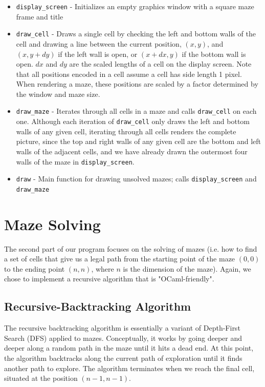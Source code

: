 \documentclass[11pt, margin=1in]{article}
\begin{document}
\begin{itemize}
\item \texttt{display\_screen} - Initializes an empty graphics window with a square maze frame and title
\item \texttt{draw\_cell} - Draws a single cell by checking the left and bottom walls of the cell and drawing a line between the current position, $(x, y)$, and $(x, y + dy)$ if the left wall is open, or $(x + dx, y)$ if the bottom wall is open. $dx$ and $dy$ are the scaled lengths of a cell on the display screen. Note that all positions encoded in a cell assume a cell has side length 1 pixel. When rendering a maze, these positions are scaled by a factor determined by the window and maze size.
\item \texttt{draw\_maze} - Iterates through all cells in a maze and calls \texttt{draw\_cell} on each one. Although each iteration of \texttt{draw\_cell} only draws the left and bottom walls of any given cell, iterating through all cells renders the complete picture, since the top and right walls of any given cell are the bottom and left walls of the adjacent cells, and we have already drawn the outermost four walls of the maze in \texttt{display\_screen}. 
\item \texttt{draw} - Main function for drawing unsolved mazes; calls \texttt{display\_screen} and \texttt{draw\_maze}
\end{itemize} 

\section{Maze Solving} 
The second part of our program focuses on the solving of mazes (i.e. how to find a set of cells that give us a legal path from the starting point of the maze $(0, 0)$ to the ending point $(n, n)$, where $n$ is the dimension of the maze).  Again, we chose to implement a recursive algorithm that is "OCaml-friendly".    

\subsection{Recursive-Backtracking Algorithm} %
The recursive backtracking algorithm is essentially a variant of Depth-First Search (DFS) applied to mazes.  Conceptually, it works by going deeper and deeper along a random path in the maze until it hits a dead end.  At this point, the algorithm backtracks along the current path of exploration until it finds another path to explore.  The algorithm terminates when we reach the final cell, situated at the position $(n - 1, n - 1)$. 
\end{document}
